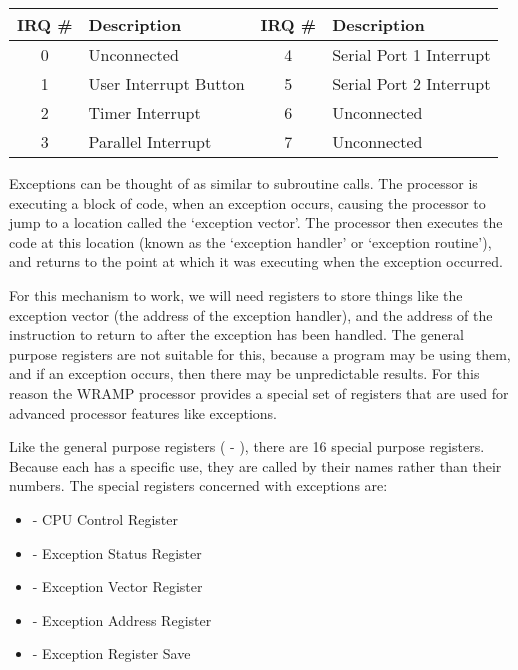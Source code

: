 \begin{center}
\begin{tabular}{|c|l|c|l|}
\hline
\textbf{IRQ \#} & \textbf{Description} & \textbf{IRQ \#} &
\textbf{Description} \\
\hline
0 & Unconnected & 4 & Serial Port 1 Interrupt \\
\hline
1 & User Interrupt Button & 5 & Serial Port 2 Interrupt\\
\hline
2 & Timer Interrupt & 6 & Unconnected \\
\hline
3 & Parallel Interrupt &7 & Unconnected \\
\hline
\end{tabular}
\end{center}

Exceptions can be thought of as similar to subroutine calls. The
processor is executing a block of code, when an exception occurs,
causing the processor to jump to a location called the `exception
vector'.  The processor then executes the code at this location (known
as the `exception handler' or `exception routine'), and returns to the
point at which it was executing when the exception occurred.

For this mechanism to work, we will need registers to store things
like the exception vector (the address of the exception handler), and
the address of the instruction to return to after the exception has
been handled. The general purpose registers are not suitable for this,
because a program may be using them, and if an exception occurs, then
there may be unpredictable results. For this reason the WRAMP
processor provides a special set of registers that are used for
advanced processor features like exceptions.

Like the general purpose registers ( - ), there are 16 special
purpose registers. Because each has a specific use, they are called by
their names rather than their numbers. The special registers concerned
with exceptions are:

\begin{itemize}
\item {} - CPU Control Register
\item {} - Exception Status Register
\item {} - Exception Vector Register
\item {} - Exception Address Register
\item {} - Exception Register Save
\end{itemize}

